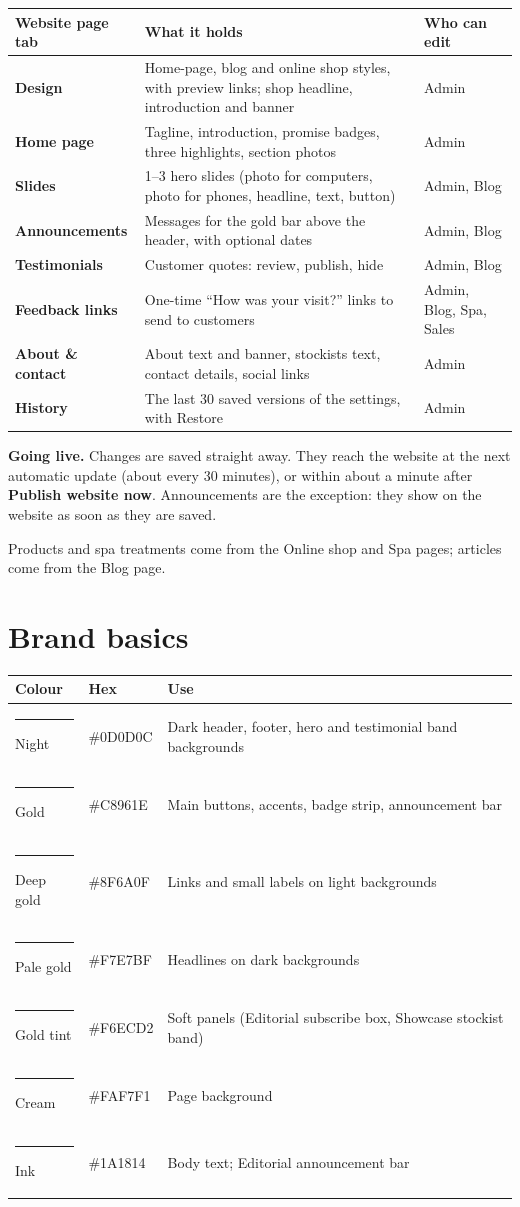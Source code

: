 \documentclass[11pt,a4paper]{article}
\newcommand{\tab}[1]{\textsf{\textbf{#1}}}
\newcommand{\swatch}[1]{\textcolor[HTML]{#1}{\rule{1.1em}{1.1em}}}
\begin{document}
\begin{tabularx}{\textwidth}{@{}l L l@{}}
\toprule
\textbf{Website page tab} & \textbf{What it holds} & \textbf{Who can edit} \\ \midrule
\tab{Design} & Home-page, blog and online shop styles, with preview links; shop headline, introduction and banner & Admin \\
\tab{Home page} & Tagline, introduction, promise badges, three highlights, section photos & Admin \\
\tab{Slides} & 1--3 hero slides (photo for computers, photo for phones, headline, text, button) & Admin, Blog \\
\tab{Announcements} & Messages for the gold bar above the header, with optional dates & Admin, Blog \\
\tab{Testimonials} & Customer quotes: review, publish, hide & Admin, Blog \\
\tab{Feedback links} & One-time ``How was your visit?'' links to send to customers & Admin, Blog, Spa, Sales \\
\tab{About \& contact} & About text and banner, stockists text, contact details, social links & Admin \\
\tab{History} & The last 30 saved versions of the settings, with Restore & Admin \\ \bottomrule
\end{tabularx}

\textbf{Going live.} Changes are saved straight away. They reach the website at the next automatic update (about every 30 minutes), or within about a minute after \tab{Publish website now}. Announcements are the exception: they show on the website as soon as they are saved.

Products and spa treatments come from the Online shop and Spa pages; articles come from the Blog page.

\section{Brand basics}
\begin{tabularx}{\textwidth}{@{}l l L@{}}
\toprule
\textbf{Colour} & \textbf{Hex} & \textbf{Use} \\ \midrule
\swatch{0D0D0C} Night & \#0D0D0C & Dark header, footer, hero and testimonial band backgrounds \\
\swatch{C8961E} Gold & \#C8961E & Main buttons, accents, badge strip, announcement bar \\
\swatch{8F6A0F} Deep gold & \#8F6A0F & Links and small labels on light backgrounds \\
\swatch{F7E7BF} Pale gold & \#F7E7BF & Headlines on dark backgrounds \\
\swatch{F6ECD2} Gold tint & \#F6ECD2 & Soft panels (Editorial subscribe box, Showcase stockist band) \\
\swatch{FAF7F1} Cream & \#FAF7F1 & Page background \\
\swatch{1A1814} Ink & \#1A1814 & Body text; Editorial announcement bar \\ \bottomrule
\end{tabularx}
\end{document}
